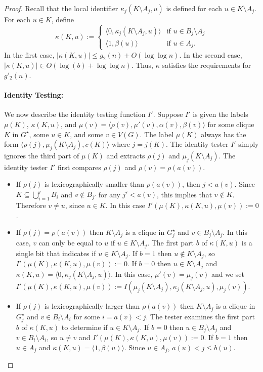 \documentclass{patmorin}
\renewcommand{\le}{\leqslant}
\newcommand{\Oh}{O}
\begin{document}
\begin{proof}
  Recall that the local identifier $\kappa_j(K\setminus A_j,u)$ is defined for each $u\in K\setminus A_j$.
  For each $u\in K$, define
  \[
    \kappa(K,u):=
    \begin{cases}
      \langle 0,\kappa_j(K\setminus A_j,u)\rangle & \text{if $u\in B_j\setminus A_j$} \\
      \langle 1,\beta(u)\rangle                   & \text{if $u\in A_j$.}
    \end{cases}
  \]
  In the first case, $|\kappa(K,u)|\le g_2(n)+\Oh(\log\log n)$.
  In the second case, $|\kappa(K,u)|\in \Oh(\log (b)+\log\log n)$.  Thus, $\kappa$ satisfies the requirements for $g'_2(n)$.

  \paragraph{Identity Testing:}
  We now describe the identity testing function $I'$.
  Suppose $I'$ is given the labels $\mu(K)$, $\kappa(K,u)$, and $\mu(v)=\langle \rho(v),\mu'(v),\alpha(v),\beta(v)\rangle$ for some clique $K$ in $G^\star$, some $u\in K$, and some $v\in V(G)$. The label $\mu(K)$ always has the form $\langle\rho(j),\mu_j(K\setminus A_j), c(K)\rangle$ where $j=j(K)$. The identity tester $I'$ simply ignores the third part of $\mu(K)$ and extracts $\rho(j)$ and $\mu_j(K\setminus A_j)$.
  The identity tester $I'$ first compares $\rho(j)$ and $\rho(v)=\rho(a(v))$.
  \begin{itemize}
    \item If $\rho(j)$ is lexicographically smaller than $\rho(a(v))$, then $j<a(v)$.  Since $K\subseteq\bigcup_{i=1}^j B_i$ and $v\not\in B_{j'}$ for any $j'<a(v)$, this implies that $v\not\in K$.  Therefore $v\neq u$, since $u\in K$. In this case $I'(\mu(K),\kappa(K,u),\mu(v)):=0$.

    \item If $\rho(j)=\rho(a(v))$ then $K\setminus A_j$ is a clique in $G^\star_j$ and $v\in B_j\setminus A_j$.
          In this case, $v$ can only be equal to $u$ if $u\in K\setminus A_j$.
          The first part $b$ of $\kappa(K,u)$ is a single bit that indicates if $u\in K\setminus A_j$.  If $b=1$ then $u\not\in K\setminus A_j$, so $I'(\mu(K),\kappa(K,u),\mu(v)):=0$.  If $b=0$ then $u\in K\setminus A_j$ and $\kappa(K,u)=\langle 0,\kappa_j(K\setminus A_j,u)\rangle$.
          In this case, $\mu'(v)=\mu_j(v)$ and we set
          $I'(\mu(K),\kappa(K,u),\mu(v)):=I(\mu_j(K\setminus A_j),\kappa_j(K\setminus A_j,u),\mu_j(v))$.

    \item If $\rho(j)$ is lexicographically larger than $\rho(a(v))$ then $K\setminus A_j$ is a clique in $G^\star_j$ and $v\in B_i\setminus A_i$ for some $i=a(v) < j$.  The tester examines the first part $b$ of $\kappa(K,u)$ to determine if $u\in K\setminus A_j$.  If $b=0$ then  $u\in B_j\setminus A_j$ and $v\in B_i\setminus A_i$, so $u\neq v$ and $I'(\mu(K),\kappa(K,u),\mu(v)):=0$.  If $b=1$ then $u\in A_j$ and $\kappa(K,u)=\langle 1,\beta(u)\rangle$. Since $u\in A_j$, $a(u) < j\le b(u)$.


\end{itemize}
\end{proof}
\end{document}
